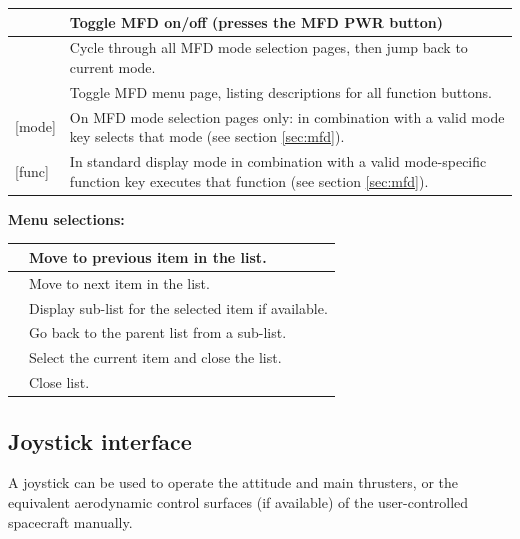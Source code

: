 \documentclass[Orbiter User Manual.tex]{subfiles}
\begin{document}
	\begin{longtable}{ >{\RaggedRight}p{}
		>{\RaggedRight}p{} }
	\hline
	\mfdkey{\esc} & Toggle MFD on/off (presses the MFD PWR button)\\
	\hline
	\mfdkey{F1} & Cycle through all MFD mode selection pages, then jump back to
		current mode.\\
	\hline
	\mfdkey{'} & Toggle MFD menu page, listing descriptions for all function
		buttons.\\
	\hline
	\Shift{} [mode] & On MFD mode selection pages only: \Shift{} in combination
		with a valid mode key selects that mode (see section \ref{sec:mfd}).\\
	\hline
	\Shift{} [func] & In standard display mode \Shift{} in combination with a
		valid mode-specific function key executes that function (see section
		\ref{sec:mfd}).\\
	\hline
	\end{longtable}

\textbf{Menu selections:}

	\begin{longtable}{ >{\RaggedRight}p{0.17\textwidth}
		>{\RaggedRight}p{} }
	\hline
	\UArrow\cur{} & Move to previous item in the list.\\
	\hline
	\DArrow\cur{} & Move to next item in the list.\\
	\hline
	\RArrow\cur{} & Display sub-list for the selected item if available.\\
	\hline
	\LArrow\cur{} & Go back to the parent list from a sub-list.\\
	\hline
	\Enter & Select the current item and close the list.\\
	\hline
	\keystroke{Esc} & Close list.\\
	\hline
	\end{longtable}


\subsection{Joystick interface}
A joystick can be used to operate the attitude and main thrusters, or the
equivalent aerodynamic control surfaces (if available) of the user-controlled
spacecraft manually.
\end{document}
